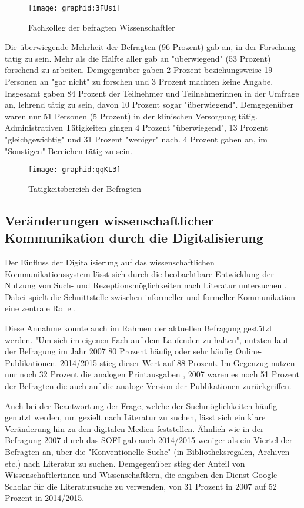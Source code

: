\begin{figure}[h!]
\texttt{[image: graphid:3FUsi]}
\caption{Fachkolleg der befragten Wissenschaftler}
\end{figure}

Die überwiegende Mehrheit der Befragten (96 Prozent) gab an, in der Forschung tätig zu sein. Mehr als die Hälfte aller gab an "überwiegend" (53 Prozent) forschend zu arbeiten. Demgegenüber gaben 2 Prozent beziehungsweise 19 Personen an "gar nicht" zu forschen und 3 Prozent machten keine Angabe. Insgesamt gaben 84 Prozent der Teilnehmer und Teilnehmerinnen in der Umfrage an, lehrend tätig zu sein, davon 10 Prozent sogar "überwiegend". Demgegenüber waren nur 51 Personen (5 Prozent) in der klinischen Versorgung tätig. Administrativen Tätigkeiten gingen 4 Prozent "überwiegend", 13 Prozent "gleichgewichtig" und 31 Prozent "weniger" nach. 4 Prozent gaben an, im "Sonstigen" Bereichen tätig zu sein.

\begin{figure}[h!]
\texttt{[image: graphid:qqKL3]}
\caption{Tatigkeitsbereich der Befragten}
\end{figure}

\subsection{Veränderungen wissenschaftlicher Kommunikation durch die Digitalisierung}

Der Einfluss der Digitalisierung auf das wissenschaftlichen Kommunikationssystem lässt sich durch die beobachtbare Entwicklung der Nutzung von Such- und Rezeptionsmöglichkeiten nach Literatur untersuchen \cite{Hanekop_2014}. Dabei spielt die Schnittstelle zwischen informeller und formeller Kommunikation eine zentrale Rolle \cite{Hanekop_2014}.

Diese Annahme konnte auch im Rahmen der aktuellen Befragung gestützt werden. "Um sich im eigenen Fach auf dem Laufenden zu halten", nutzten laut der Befragung im Jahr 2007 80 Prozent häufig oder sehr häufig Online-Publikationen. 2014/2015 stieg dieser Wert auf 88 Prozent. Im Gegenzug nutzen nur noch 32 Prozent die analogen Printausgaben , 2007 waren es noch 51 Prozent der Befragten die auch auf die analoge Version der Publikationen zurückgriffen.

Auch bei der Beantwortung der Frage, welche der Suchmöglichkeiten häufig genutzt werden, um gezielt nach Literatur zu suchen, lässt sich ein klare Veränderung hin zu den digitalen Medien feststellen. Ähnlich wie in der Befragung 2007 durch das SOFI gab auch 2014/2015 weniger als ein Viertel der Befragten an, über die "Konventionelle Suche" (in Bibliotheksregalen, Archiven etc.) nach Literatur zu suchen. Demgegenüber stieg der Anteil von Wissenschaftlerinnen und Wissenschaftlern, die angaben den Dienst Google Scholar für die Literatursuche zu verwenden, von 31 Prozent in 2007 auf 52 Prozent in 2014/2015.

